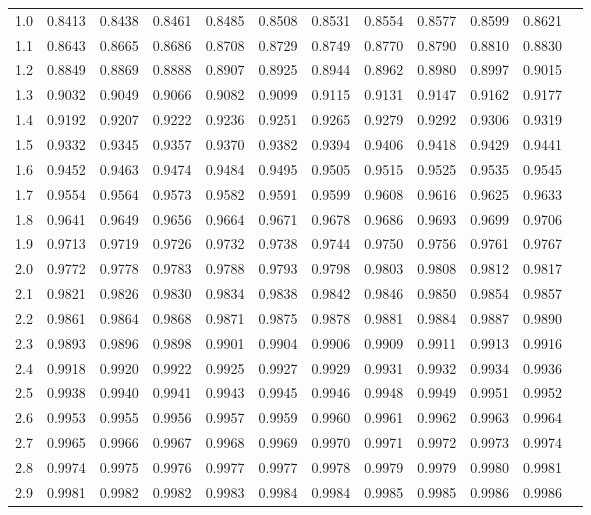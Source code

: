 \documentclass[a4paper,12pt, twoside]{article}
\begin{document}
\begin{center}
\begin{tabular}{rr@{\ }r@{\ }r@{\ }r@{\ }r@{\ }r@{\ }r@{\ }r@{\ }r@{\ }r@{\ }r}
1.0&0.8413&0.8438&0.8461&0.8485&0.8508&0.8531&0.8554&0.8577&0.8599&0.8621\\
1.1&0.8643&0.8665&0.8686&0.8708&0.8729&0.8749&0.8770&0.8790&0.8810&0.8830\\
1.2&0.8849&0.8869&0.8888&0.8907&0.8925&0.8944&0.8962&0.8980&0.8997&0.9015\\
1.3&0.9032&0.9049&0.9066&0.9082&0.9099&0.9115&0.9131&0.9147&0.9162&0.9177\\
1.4&0.9192&0.9207&0.9222&0.9236&0.9251&0.9265&0.9279&0.9292&0.9306&0.9319\\
1.5&0.9332&0.9345&0.9357&0.9370&0.9382&0.9394&0.9406&0.9418&0.9429&0.9441\\
1.6&0.9452&0.9463&0.9474&0.9484&0.9495&0.9505&0.9515&0.9525&0.9535&0.9545\\
1.7&0.9554&0.9564&0.9573&0.9582&0.9591&0.9599&0.9608&0.9616&0.9625&0.9633\\
1.8&0.9641&0.9649&0.9656&0.9664&0.9671&0.9678&0.9686&0.9693&0.9699&0.9706\\
1.9&0.9713&0.9719&0.9726&0.9732&0.9738&0.9744&0.9750&0.9756&0.9761&0.9767\\[0.2cm]

2.0&0.9772&0.9778&0.9783&0.9788&0.9793&0.9798&0.9803&0.9808&0.9812&0.9817\\
2.1&0.9821&0.9826&0.9830&0.9834&0.9838&0.9842&0.9846&0.9850&0.9854&0.9857\\
2.2&0.9861&0.9864&0.9868&0.9871&0.9875&0.9878&0.9881&0.9884&0.9887&0.9890\\
2.3&0.9893&0.9896&0.9898&0.9901&0.9904&0.9906&0.9909&0.9911&0.9913&0.9916\\
2.4&0.9918&0.9920&0.9922&0.9925&0.9927&0.9929&0.9931&0.9932&0.9934&0.9936\\
2.5&0.9938&0.9940&0.9941&0.9943&0.9945&0.9946&0.9948&0.9949&0.9951&0.9952\\
2.6&0.9953&0.9955&0.9956&0.9957&0.9959&0.9960&0.9961&0.9962&0.9963&0.9964\\
2.7&0.9965&0.9966&0.9967&0.9968&0.9969&0.9970&0.9971&0.9972&0.9973&0.9974\\
2.8&0.9974&0.9975&0.9976&0.9977&0.9977&0.9978&0.9979&0.9979&0.9980&0.9981\\
2.9&0.9981&0.9982&0.9982&0.9983&0.9984&0.9984&0.9985&0.9985&0.9986&0.9986\\[0.2cm]


\end{tabular}
\end{center}
\end{document}
